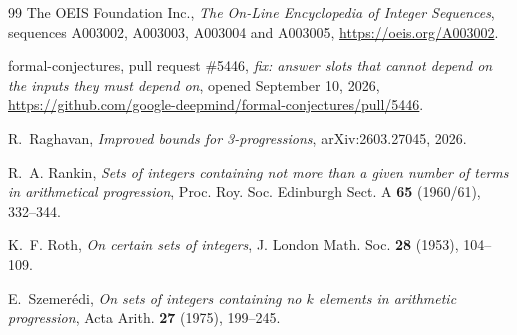 \documentclass[11pt]{amsart}
\theoremstyle{plain}
\theoremstyle{definition}
\begin{document}
\begin{thebibliography}{99}
The OEIS Foundation Inc., \emph{The On-Line Encyclopedia of Integer Sequences}, sequences A003002, A003003, A003004 and A003005, \url{https://oeis.org/A003002}.

formal-conjectures, pull request \#5446, \emph{fix: answer slots that cannot depend on the inputs they must depend on}, opened September 10, 2026, \url{https://github.com/google-deepmind/formal-conjectures/pull/5446}.

R.~Raghavan, \emph{Improved bounds for 3-progressions}, arXiv:2603.27045, 2026.

R.~A. Rankin, \emph{Sets of integers containing not more than a given number of terms in arithmetical progression}, Proc. Roy. Soc. Edinburgh Sect. A \textbf{65} (1960/61), 332--344.

K.~F. Roth, \emph{On certain sets of integers}, J. London Math. Soc. \textbf{28} (1953), 104--109.

E.~Szemer\'edi, \emph{On sets of integers containing no $k$ elements in arithmetic progression}, Acta Arith. \textbf{27} (1975), 199--245.

\end{thebibliography}
\end{document}
